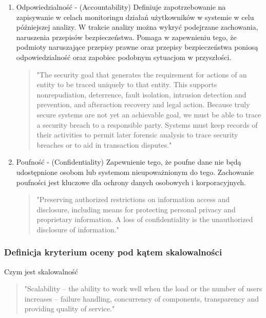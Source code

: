\documentclass[runningheads,12pt]{llncs}
\begin{document}
\begin{enumerate}
    \item Odpowiedzialność - (Accountability) Definiuje zapotrzebowanie na zapisywanie w celach monitoringu działań użytkowników w systemie w celu późniejszej analizy. W trakcie analizy można wykryć podejrzane zachowania, naruszenia przepisów bezpieczeństwa. Pomaga w zapewnieniu tego, że podmioty naruszające przepisy prawne oraz przepisy bezpieczeństwa poniosą odpowiedzialność oraz zapobiec podobnym sytuacjom w przyszłości.
    \begin{quote}
        "The security goal that generates the requirement for actions of an entity to be traced uniquely to that entity. This supports nonrepudiation, deterrence, fault isolation, intrusion detection and prevention, and afteraction recovery and legal action. Because truly secure systems are not yet an achievable goal, we must be able to trace a security breach to a responsible party. Systems must keep records of their activities to permit later forensic analysis to trace security breaches or to aid in transaction disputes." ~\cite[p. 23]{stallings2017cryptography}
    \end{quote}
    \item Poufność - (Confidentiality) Zapewnienie tego, że poufne dane nie będą udostępnione osobom lub systemom nieupoważnionym do tego. Zachowanie poufności jest kluczowe dla ochrony danych osobowych i korporacyjnych.
    \begin{quote}
        "Preserving authorized restrictions on information access and disclosure, including means for protecting personal privacy and proprietary information. A loss of confidentiality is the unauthorized disclosure of information." ~\cite[p. 22]{stallings2017cryptography}
    \end{quote}
\end{enumerate}

\subsubsection{Definicja kryterium oceny pod kątem skalowalności}

Czym jest skalowalność 

\begin{quote}
    "Scalability – the ability to work well when the load or the number of users increases – failure handling, concurrency of components, transparency and providing quality of service." ~\cite[p. 21]{coulouris2011distributed}
\end{quote}
\end{document}
